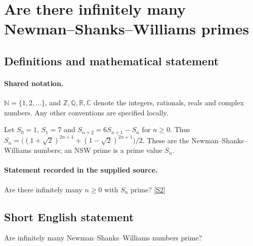 \documentclass[11pt]{article}
\newcommand{\sref}[2]{\hyperlink{source:#1:#2}{[S#2]}}
\begin{document}
\section{Are there infinitely many Newman–Shanks–Williams primes}\label{statement}

\subsection{Definitions and mathematical statement}

\paragraph{Shared notation.}$\mathbb N=\{1,2,\ldots\}$, and $\mathbb Z,\mathbb Q,\mathbb R,\mathbb C$ denote the integers, rationals, reals and complex numbers. Any other conventions are specified locally.


Let $S_0=1$, $S_1=7$ and $S_{n+2}=6S_{n+1}-S_n$ for $n\ge0$. Thus $S_n=\bigl((1+\sqrt2)^{2n+1}+(1-\sqrt2)^{2n+1}\bigr)/2$. These are the Newman--Shanks--Williams numbers; an NSW prime is a prime value $S_n$.
\paragraph{Statement recorded in the supplied source.}
Are there infinitely many $n\ge0$ with $S_n$ prime? \sref{statement}{2}
\subsection{Short English statement}
Are infinitely many Newman–Shanks–Williams numbers prime?
\end{document}
